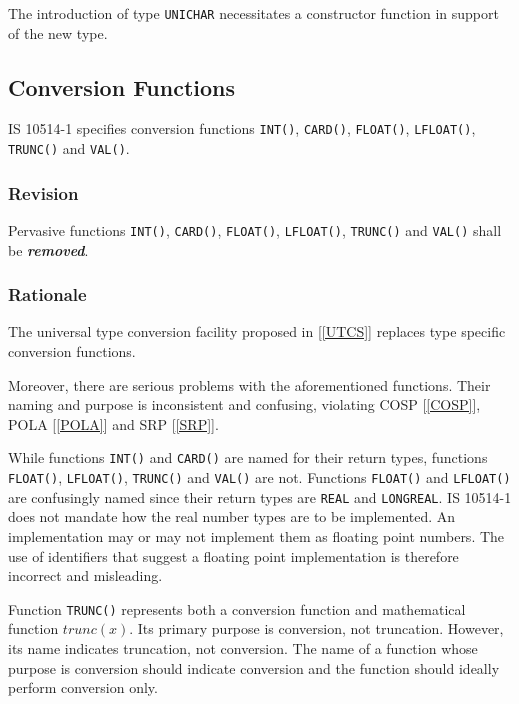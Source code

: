 \documentclass[10pt,a4paper,leqno,fleqn]{article}
\renewcommand{\emph}[1]{\textbf{\textit{#1}}}
\begin{document}
The introduction of type \texttt{UNICHAR} necessitates a constructor function
in support of the new type.


\subsection{Conversion Functions}

IS 10514-1 specifies conversion functions \verb|INT()|, \verb|CARD()|,
\verb|FLOAT()|, \verb|LFLOAT()|, \verb|TRUNC()| and \verb|VAL()|.

\subsubsection{Revision}

Pervasive functions \verb|INT()|, \verb|CARD()|, \verb|FLOAT()|,
\verb|LFLOAT()|, \verb|TRUNC()| and \verb|VAL()| shall be \emph{removed}.

\subsubsection{Rationale}

The universal type conversion facility proposed in
[\ref{UTCS}] replaces type specific conversion functions.

\noindent Moreover, there are serious problems with the aforementioned functions.
Their naming and purpose is inconsistent and confusing, violating
COSP [\ref{COSP}], POLA [\ref{POLA}] and SRP [\ref{SRP}].

While functions \verb|INT()| and \verb|CARD()| are named for their return types,
functions \verb|FLOAT()|, \verb|LFLOAT()|, \verb|TRUNC()| and \verb|VAL()| are not.
Functions \verb|FLOAT()| and \verb|LFLOAT()| are confusingly named since
their return types are \verb|REAL| and \verb|LONGREAL|. IS 10514-1 does not
mandate how the real number types are to be implemented. An implementation
may or may not implement them as floating point numbers. The use of identifiers
that suggest a floating point implementation is therefore incorrect and misleading.

Function \verb|TRUNC()| represents both a conversion function and
mathematical function $trunc(x)$. Its primary purpose is conversion, not truncation.
However, its name indicates truncation, not conversion. The name of a function
whose purpose is conversion should indicate conversion and the function should
ideally perform conversion only.
\end{document}
